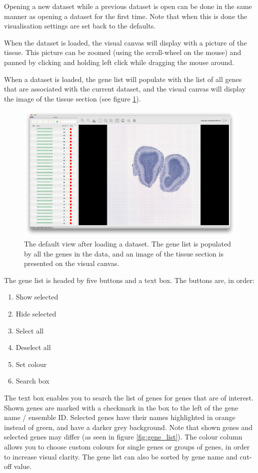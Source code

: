 \documentclass[10pt,a4paper,titlepage]{book}
\begin{document}
Opening a new dataset while a previous dataset is open can be done in the same manner as opening a dataset for the first time. Note that when this is done the visualisation settings are set back to the defaults.

When the dataset is loaded, the visual canvas will display with a picture of the tissue. This picture can be zoomed (using the scroll-wheel on the mouse) and panned by clicking and holding left click while dragging the mouse around.

When a dataset is loaded, the gene list will populate with the list of all genes that are associated with the current dataset, and the visual canvas will display the image of the tissue section (see figure \ref{fig:default_loaded_data}). 
\begin{figure}[h]
	\centering
	\includegraphics[width=0.8\linewidth]{./Pictures/default_dataset_loaded}
	\caption[Default view after loading a dataset]{The default view after loading a dataset. The gene list is populated by all the genes in the data, and an image of the tissue section is presented on the visual canvas.}
	\label{fig:default_loaded_data}
\end{figure}

The gene list is headed by five buttons and a text box. The buttons are, in order:
\begin{enumerate}
\item	Show selected
\item	Hide selected
\item	Select all
\item	Deselect all
\item	Set colour
\item	Search box
\end{enumerate}

The text box enables you to search the list of genes for genes that are of interest. Shown genes are marked with a checkmark in the box to the left of the gene name / ensemble ID. Selected genes have their names highlighted in orange instead of green, and have a darker grey background. Note that shown genes and selected genes may differ (as seen in figure \ref{fig:gene_list}). The colour column allows you to choose custom colours for single genes or groups of genes, in order to increase visual clarity. The gene list can also be sorted by gene name and cut-off value.
\end{document}
